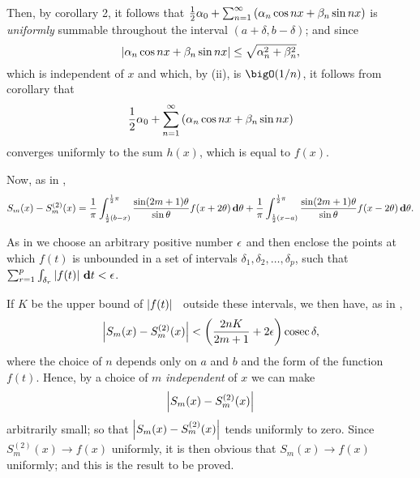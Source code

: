 Then, by  corollary 2,%
it follows that
$\frac{1}{2} \alpha_{0} + \sum_{n=1}^{\infty} \left( \alpha_{n} \cos nx + \beta_{n} \sin nx \right)$
is \emph{uniformly} summable throughout the interval $(a+\delta, b-\delta)$;
and since
$$
\left| 
  \alpha_{n} \cos nx + \beta_{n} \sin nx
 \right|
\leq
\sqrt{
  \alpha_{n}^{2} + \beta_{n}^{2}
},
$$
which is independent of $x$ and which, by  (ii), %
is $\bigO(1/n)$, it
follows from  corollary that
$$
\frac{1}{2} \alpha_{0} + \sum_{n=1}^{\infty} \left( \alpha_{n} \cos nx + \beta_{n} \sin nx \right)
$$
converges uniformly to the sum $h(x)$, which is equal to $f(x)$.

Now, as in ,
$$
S_{m}(x)
-
S_{m}^{(2)}(x)
=
\frac{1}{\pi}
\int_{\frac{1}{2} (b-x)}^{\frac{1}{2} \pi}
\frac{\sin (2m+1)\theta}{\sin \theta}
f(x + 2\theta)
\, \mathbf{d} \theta
+
\frac{1}{\pi}
\int_{\frac{1}{2} (x-a)}^{\frac{1}{2} \pi}
\frac{\sin (2m+1)\theta}{\sin \theta}
f(x - 2\theta)
\, \mathbf{d} \theta.
$$
%
%

As in  we choose an arbitrary positive number
$\epsilon$ and then enclose the points at which $f(t)$ is unbounded in a set of intervals
$\delta_{1}, \delta_{2}, \ldots, \delta_{p}$, such
that
$\sum_{r=1}^{p} \int_{\delta_{r}} \left| f(t) \right| \, \mathbf{d} t < \epsilon$.

If $K$ be the upper bound of $\left| f(t) \right|$ \ outside these intervals, we then
have, as in ,
$$
\left| 
  S_{m}(x) - S_{m}^{(2)}(x)
 \right|
<
\left( 
  \frac{2nK}{2m + 1} + 2\epsilon
 \right)
\operatorname{cosec} \delta,
$$
where the choice of $n$ depends only on $a$ and $b$ and the form of the
function $f(t)$. Hence, by a choice of $m$ \emph{independent} of $x$ we can make
$$
\left| 
  S_{m}(x) - S_{m}^{(2)}(x)
 \right|
$$
arbitrarily small; so that $\left| S_{m}(x) - S_{m}^{(2)}(x) \right|$
tends uniformly to zero. Since
$S_{m}^{(2)}(x) \rightarrow f(x)$
uniformly, it is then obvious that
$S_{m}(x) \rightarrow f(x)$
uniformly; and this is the result to be proved.

